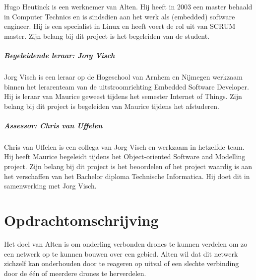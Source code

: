 \documentclass[a4paper, 11pt, oneside]{report}
\begin{document}
Hugo Heutinck is een werknemer van Alten. Hij heeft in 2003 een master behaald in Computer Technics en is sindsdien aan het werk als (embedded) software engineer. Hij is een specialist in Linux en heeft voert de rol uit van SCRUM master. Zijn belang bij dit project is het begeleiden van de student.

\paragraph{Begeleidende leraar: Jorg Visch}
 
Jorg Visch is een leraar op de Hogeschool van Arnhem en Nijmegen werkzaam binnen het lerarenteam van de uitstroomrichting Embedded Software Developer. Hij is leraar van Maurice geweest tijdens het semester Internet of Things. Zijn belang bij dit project is begeleiden van Maurice tijdens het afstuderen.

\paragraph{Assessor: Chris van Uffelen}

Chris van Uffelen is een collega van Jorg Visch en werkzaam in hetzelfde team. Hij heeft Maurice begeleidt tijdens het Object-oriented Software and Modelling project. Zijn belang bij dit project is het beoordelen of het project waardig is aan het verschaffen van het Bachelor diploma Technische Informatica. Hij doet dit in samenwerking met Jorg Visch. 


\chapter{Opdrachtomschrijving}\label{sec:opdrachtomschrijving}
Het doel van Alten is om onderling verbonden drones te kunnen verdelen om zo een netwerk op te kunnen bouwen over een gebied. 
Alten wil dat dit netwerk zichzelf kan onderhouden door te reageren op uitval of een slechte verbinding door de één of meerdere drones te herverdelen.
\end{document}
